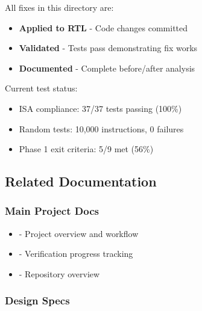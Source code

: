 \begin{record}

All fixes in this directory are:

\begin{itemize}
\tightlist
\item
  \ok{} \textbf{Applied to RTL} - Code changes committed
\item
  \ok{} \textbf{Validated} - Tests pass demonstrating fix works
\item
  \ok{} \textbf{Documented} - Complete before/\allowbreak{}after
  analysis
\end{itemize}

Current test status:

\begin{itemize}
\tightlist
\item
  ISA compliance: 37/37 tests passing (100\%)
\item
  Random tests: 10,000 instructions, 0 failures
\item
  Phase 1 exit criteria: 5/9 met (56\%)
\end{itemize}

\end{record}

\subsection{Related Documentation}\label{cr:fix:fixes-readme:related-documentation}

\subsubsection{Main Project Docs}\label{cr:fix:fixes-readme:main-project-docs}

\begin{record}

\begin{itemize}
\tightlist
\item
   - Project overview and workflow
\item
   - Verification progress tracking
\item
   - Repository overview
\end{itemize}

\end{record}

\subsubsection{Design Specs}\label{cr:fix:fixes-readme:design-specs}

